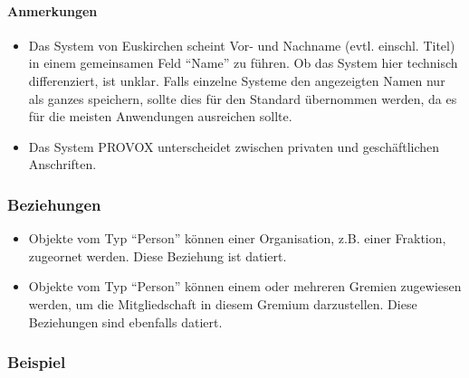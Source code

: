 \documentclass[,a4paper]{article}
\begin{document}
\paragraph{Anmerkungen}

\begin{itemize}
\item
  Das System von Euskirchen scheint Vor- und Nachname (evtl. einschl.
  Titel) in einem gemeinsamen Feld ``Name'' zu führen. Ob das System
  hier technisch differenziert, ist unklar. Falls einzelne Systeme den
  angezeigten Namen nur als ganzes speichern, sollte dies für den
  Standard übernommen werden, da es für die meisten Anwendungen
  ausreichen sollte.
\item
  Das System PROVOX unterscheidet zwischen privaten und geschäftlichen
  Anschriften.
\end{itemize}

\subsubsection{Beziehungen}

\begin{itemize}
\item
  Objekte vom Typ ``Person'' können einer Organisation, z.B. einer
  Fraktion, zugeornet werden. Diese Beziehung ist datiert.
\item
  Objekte vom Typ ``Person'' können einem oder mehreren Gremien
  zugewiesen werden, um die Mitgliedschaft in diesem Gremium
  darzustellen. Diese Beziehungen sind ebenfalls datiert.
\end{itemize}

\subsubsection{Beispiel}
\end{document}
